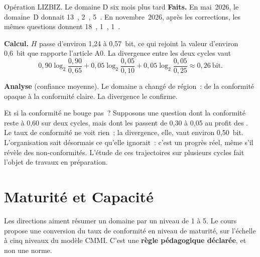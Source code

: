 \begin{boxscenario}{Opération LIZBIZ. Le domaine D six mois plus tard}
\textbf{Faits.} En mai~2026, le domaine~D donnait 13~\OUI{}, 2~\NON{},
5~\NEK{}. En novembre~2026, après les corrections, les mêmes questions donnent
18~\OUI{}, 1~\NON{}, 1~\NEK{}.

\medskip
\textbf{Calcul.} $H$ passe d'environ 1,24 à 0,57~bit, ce qui rejoint la valeur
d'environ 0,6~bit que rapporte l'article A0. La divergence entre les deux
cycles vaut
\[
    0{,}90\log_2\frac{0{,}90}{0{,}65} + 0{,}05\log_2\frac{0{,}05}{0{,}10} +
    0{,}05\log_2\frac{0{,}05}{0{,}25} \approx 0{,}26~\text{bit}.
\]

\textbf{Analyse} (confiance moyenne). Le domaine a changé de région~: de la
conformité opaque à la conformité claire. La divergence le confirme.
\end{boxscenario}

\begin{boiteRemarque}{Et si la conformité ne bouge pas~?}
Supposons une question dont la conformité reste à 0,60 sur deux cycles,
mais dont les \NEK{} passent de 0,30 à 0,05 au profit des \NON{}. Le taux de
conformité ne voit rien~; la divergence, elle, vaut environ 0,50~bit.
L'organisation sait désormais ce qu'elle ignorait~: c'est un progrès réel,
même s'il révèle des non-conformités. L'étude de ces trajectoires sur
plusieurs cycles fait l'objet de travaux en préparation.
\end{boiteRemarque}

\section{Maturité et Capacité}
\label{sec:c09-maturite}

Les directions aiment résumer un domaine par un niveau de 1 à 5. Le cours
propose une conversion du taux de conformité en niveau de maturité, sur
l'échelle à cinq niveaux du modèle CMMI. C'est une \textbf{règle
pédagogique déclarée}, et non une norme.

